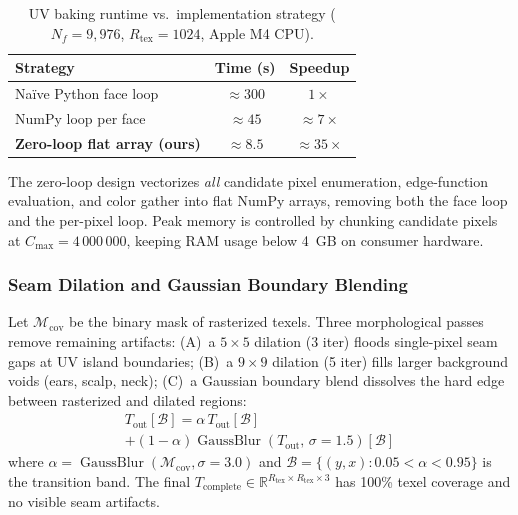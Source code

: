\documentclass[conference]{IEEEtran}
\newcommand{\R}{\mathbb{R}}
\newcommand{\Tcomplete}{T_{\text{complete}}}
\newcommand{\Tout}{T_{\text{out}}}
\begin{document}
\begin{table}[h]
  \caption{UV baking runtime vs.\ implementation strategy ($N_f=9{,}976$,
           $R_{\text{tex}}=1024$, Apple M4 CPU).}
  \label{tab:speedup}
  \centering
  \footnotesize
  \begin{tabular}{@{}lcc@{}}
    \toprule
    Strategy & Time (s) & Speedup \\
    \midrule
    Naïve Python face loop       & ${\approx}300$ & $1\times$ \\
    NumPy loop per face          & ${\approx}45$  & ${\approx}7\times$ \\
    \textbf{Zero-loop flat array (ours)} & ${\approx}8.5$ & ${\approx}35\times$ \\
    \bottomrule
  \end{tabular}
\end{table}

The zero-loop design vectorizes \emph{all} candidate pixel enumeration,
edge-function evaluation, and color gather into flat NumPy arrays, removing
both the face loop and the per-pixel loop. Peak memory is controlled by
chunking candidate pixels at $C_{\max} = 4\,000\,000$, keeping RAM usage
below 4~GB on consumer hardware.

\subsubsection{Seam Dilation and Gaussian Boundary Blending}

Let $\mathcal{M}_{\text{cov}}$ be the binary mask of rasterized texels. Three
morphological passes remove remaining artifacts: (A)~a $5\!\times\!5$ dilation
(3 iter) floods single-pixel seam gaps at UV island boundaries; (B)~a
$9\!\times\!9$ dilation (5 iter) fills larger background voids (ears, scalp,
neck); (C)~a Gaussian boundary blend dissolves the hard edge between rasterized
and dilated regions:
\begin{multline}
  \Tout[\mathcal{B}] = \alpha\,\Tout[\mathcal{B}] \\
    + (1-\alpha)\operatorname{GaussBlur}(\Tout,\,\sigma{=}1.5)[\mathcal{B}]
  \label{eq:gauss_blend}
\end{multline}
where $\alpha = \operatorname{GaussBlur}(\mathcal{M}_{\text{cov}}, \sigma{=}3.0)$
and $\mathcal{B} = \{(y,x) : 0.05 < \alpha < 0.95\}$ is the transition band.
The final $\Tcomplete \in \R^{R_{\text{tex}} \times R_{\text{tex}} \times 3}$
has 100\% texel coverage and no visible seam artifacts.
\end{document}
